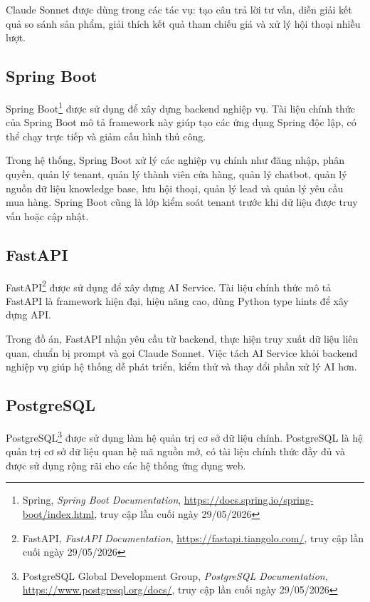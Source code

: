 \documentclass[../DoAn.tex]{subfiles}
\begin{document}
Claude Sonnet được dùng trong các tác vụ: tạo câu trả lời tư vấn, diễn giải kết quả so sánh sản phẩm, giải thích kết quả tham chiếu giá và xử lý hội thoại nhiều lượt.

\subsection{Spring Boot}
\label{subsection:3.2.2}

Spring Boot\footnote{Spring, \textit{Spring Boot Documentation}, \url{https://docs.spring.io/spring-boot/index.html}, truy cập lần cuối ngày 29/05/2026} được sử dụng để xây dựng backend nghiệp vụ. Tài liệu chính thức của Spring Boot mô tả framework này giúp tạo các ứng dụng Spring độc lập, có thể chạy trực tiếp và giảm cấu hình thủ công.

Trong hệ thống, Spring Boot xử lý các nghiệp vụ chính như đăng nhập, phân quyền, quản lý tenant, quản lý thành viên cửa hàng, quản lý chatbot, quản lý nguồn dữ liệu knowledge base, lưu hội thoại, quản lý lead và quản lý yêu cầu mua hàng. Spring Boot cũng là lớp kiểm soát tenant trước khi dữ liệu được truy vấn hoặc cập nhật.

\subsection{FastAPI}
\label{subsection:3.2.3}

FastAPI\footnote{FastAPI, \textit{FastAPI Documentation}, \url{https://fastapi.tiangolo.com/}, truy cập lần cuối ngày 29/05/2026} được sử dụng để xây dựng AI Service. Tài liệu chính thức mô tả FastAPI là framework hiện đại, hiệu năng cao, dùng Python type hints để xây dựng API.

Trong đồ án, FastAPI nhận yêu cầu từ backend, thực hiện truy xuất dữ liệu liên quan, chuẩn bị prompt và gọi Claude Sonnet. Việc tách AI Service khỏi backend nghiệp vụ giúp hệ thống dễ phát triển, kiểm thử và thay đổi phần xử lý AI hơn.

\subsection{PostgreSQL}
\label{subsection:3.2.4}

PostgreSQL\footnote{PostgreSQL Global Development Group, \textit{PostgreSQL Documentation}, \url{https://www.postgresql.org/docs/}, truy cập lần cuối ngày 29/05/2026} được sử dụng làm hệ quản trị cơ sở dữ liệu chính. PostgreSQL là hệ quản trị cơ sở dữ liệu quan hệ mã nguồn mở, có tài liệu chính thức đầy đủ và được sử dụng rộng rãi cho các hệ thống ứng dụng web.
\end{document}
